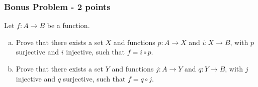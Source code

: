 \newpage\documentclass[11pt,onecolumn,fleqn]{article}
\theoremstyle{definition}
\begin{document}
\subsubsection*{Bonus Problem - 2 points}
Let $f : A \to B$ be a function.
\begin{enumerate}[(a)]
\item Prove that there exists a set $X$ and functions $p : A \to X$ and $i : X \to B$, with $p$ surjective and $i$ injective, 
such that $f = i \circ p$.
\item Prove that there exists a set $Y$ and functions $j : A \to Y$ and $q : Y \to B$, with $j$ injective and $q$ surjective, 
such that $f = q \circ j$.
\end{enumerate}
\end{document}
